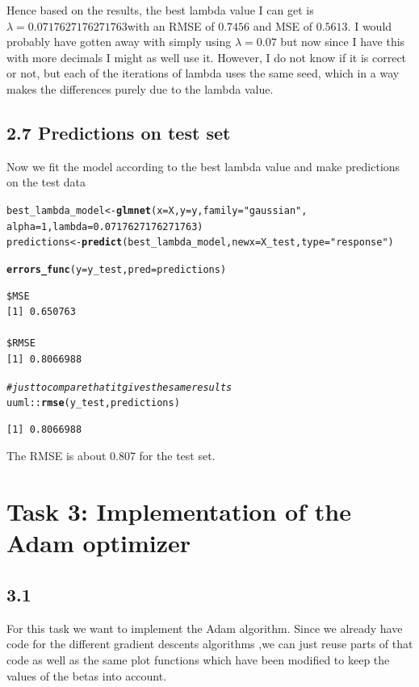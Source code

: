 \documentclass[11pt, a4paper, english]{article}\usepackage[]{graphicx}\usepackage[dvipsnames]{xcolor}
\makeatletter
\newcommand{\hlnum}[1]{\textcolor[rgb]{0.686,0.059,0.569}{#1}}%
\newcommand{\hlstr}[1]{\textcolor[rgb]{0.192,0.494,0.8}{#1}}%
\newcommand{\hlcom}[1]{\textcolor[rgb]{0.678,0.584,0.686}{\textit{#1}}}%
\newcommand{\hlopt}[1]{\textcolor[rgb]{0,0,0}{#1}}%
\newcommand{\hlstd}[1]{\textcolor[rgb]{0.345,0.345,0.345}{#1}}%
\newcommand{\hlkwb}[1]{\textcolor[rgb]{0.69,0.353,0.396}{#1}}%
\newcommand{\hlkwc}[1]{\textcolor[rgb]{0.333,0.667,0.333}{#1}}%
\newcommand{\hlkwd}[1]{\textcolor[rgb]{0.737,0.353,0.396}{\textbf{#1}}}%
\newenvironment{kframe}{%
 \def\at@end@of@kframe{}%
 \ifinner\ifhmode%
  \def\at@end@of@kframe{\end{minipage}}%
  \begin{minipage}{\columnwidth}%
 \fi\fi%
 \def\FrameCommand##1{\hskip\@totalleftmargin \hskip-\fboxsep
 \colorbox{shadecolor}{##1}\hskip-\fboxsep
     \hskip-\linewidth \hskip-\@totalleftmargin \hskip\columnwidth}%
 \MakeFramed {\advance\hsize-\width
   \@totalleftmargin\z@ \linewidth\hsize
   \@setminipage}}%
 {\par\unskip\endMakeFramed%
 \at@end@of@kframe}
\newenvironment{knitrout}{}{} %
\makeatother
\begin{document}
Hence based on the results, the best lambda value I can get is $\lambda=0.0717627176271763 $with an RMSE of $0.7456$ and MSE of $0.5613$. I would probably have gotten away with simply using $\lambda = 0.07$ but now since I have this with more decimals I might as well use it.  However, I do not know if it is correct or not, but each of the iterations of lambda uses the same seed, which in a way makes the differences purely due to the lambda value.

\subsection{2.7 Predictions on test set}
Now we fit the model according to the best lambda value and make predictions on the test data
\begin{knitrout}
\color{fgcolor}\begin{kframe}
\begin{alltt}
\hlstd{best_lambda_model} \hlkwb{<-} \hlkwd{glmnet}\hlstd{(}\hlkwc{x} \hlstd{= X,} \hlkwc{y}\hlstd{= y,} \hlkwc{family} \hlstd{=} \hlstr{"gaussian"}\hlstd{,}
                            \hlkwc{alpha}\hlstd{=}\hlnum{1}\hlstd{,} \hlkwc{lambda}\hlstd{=} \hlnum{0.0717627176271763}\hlstd{)}
\hlstd{predictions} \hlkwb{<-} \hlkwd{predict}\hlstd{(best_lambda_model,} \hlkwc{newx} \hlstd{= X_test,} \hlkwc{type}\hlstd{=}\hlstr{"response"}\hlstd{)}

\hlkwd{errors_func}\hlstd{(}\hlkwc{y}\hlstd{=y_test,} \hlkwc{pred}\hlstd{= predictions)}
\end{alltt}
\begin{verbatim}
$MSE
[1] 0.650763

$RMSE
[1] 0.8066988
\end{verbatim}
\begin{alltt}
\hlcom{#just to compare that it gives the same results}
\hlstd{uuml}\hlopt{::}\hlkwd{rmse}\hlstd{(y_test, predictions)}
\end{alltt}
\begin{verbatim}
[1] 0.8066988
\end{verbatim}
\end{kframe}
\end{knitrout}
The RMSE is about 0.807 for the test set. 


\section{Task 3: Implementation of the Adam optimizer}
\subsection{3.1}
For this task we want to implement the Adam algorithm. Since we already have code for the different gradient descents algorithms ,we can just reuse parts of that code as well as the same plot functions which have been modified to keep the values of the betas into account. 
\end{document}
